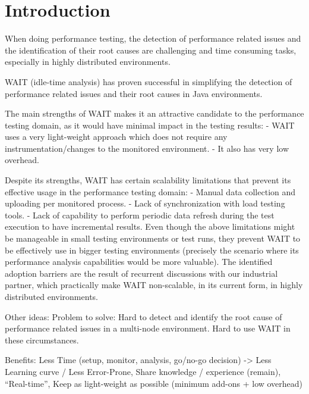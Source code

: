 \documentclass[runningheads,a4paper]{llncs}
\begin{document}


\section{Introduction}

When doing performance testing, the detection of performance related issues and the identification of their root causes are challenging and time consuming tasks, especially in highly distributed environments.

WAIT (idle-time analysis) has proven successful in simplifying the detection of performance related issues and their root causes in Java environments.

The main strengths of WAIT makes it an attractive candidate to the performance testing domain, as it would have minimal impact in the testing results:
- WAIT uses a very light-weight approach which does not require any instrumentation/changes to the monitored environment. 
- It also has very low overhead.

Despite its strengths, WAIT has certain scalability limitations that prevent its effective usage in the performance testing domain:
- Manual data collection and uploading per monitored process.
- Lack of synchronization with load testing tools. 
- Lack of capability to perform periodic data refresh during the test execution to have incremental results.
Even though the above limitations might be manageable in small testing environments or test runs, they prevent WAIT to be effectively use in bigger testing environments (precisely the scenario where its performance analysis capabilities would be more valuable).
The identified adoption barriers are the result of recurrent discussions with our industrial partner, which practically make WAIT non-scalable, in its current form, in highly distributed environments.

Other ideas:
Problem to solve: Hard to detect and identify the root cause of performance
related issues in a multi-node environment. Hard to use WAIT in these circumstances.

Benefits: Less Time (setup, monitor, analysis, go/no-go decision) -> Less
Learning curve / Less Error-Prone, Share knowledge / experience (remain), 
“Real-time”, Keep as light-weight as possible (minimum add-ons + low overhead)
\end{document}
